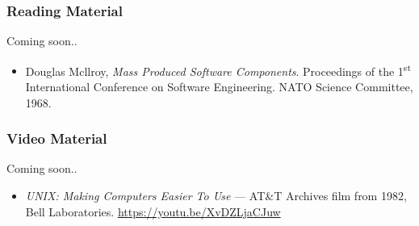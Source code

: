 \begin{frame}

\frametitle{Reading Material}

\begin{center}

Coming soon..

\end{center}

\footnotesize

\begin{itemize}

\item Douglas Mcllroy, \emph{Mass Produced Software Components}. Proceedings of
the 1\textsuperscript{st} International Conference on Software Engineering.
NATO Science Committee, 1968.

\end{itemize}

\end{frame}


\begin{frame}

\frametitle{Video Material}

\begin{center}

Coming soon..

\end{center}

\footnotesize

\begin{itemize}

\item \emph{UNIX: Making Computers Easier To Use} --- AT\&T Archives film from
1982, Bell Laboratories. \url{https://youtu.be/XvDZLjaCJuw}

\end{itemize}

\end{frame}

